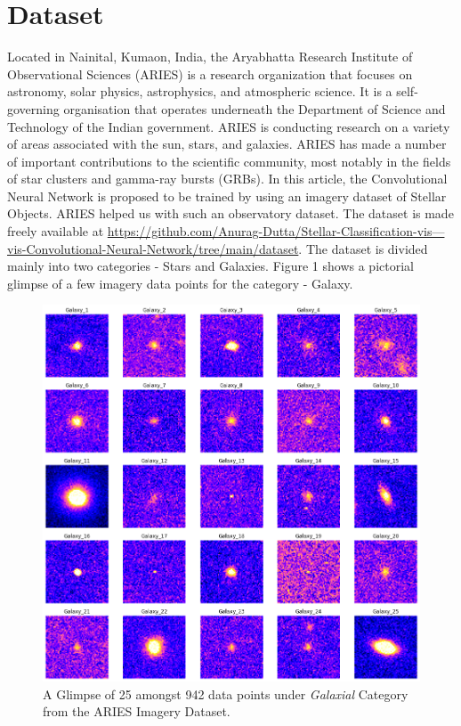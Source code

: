 \documentclass[conference]{IEEEtran}
\begin{document}
\section{Dataset}
Located in Nainital, Kumaon, India, the Aryabhatta Research Institute of Observational Sciences (ARIES) is a research organization that focuses on astronomy, solar physics, astrophysics, and atmospheric science. It is a self-governing organisation that operates underneath the Department of Science and Technology of the Indian government. ARIES is conducting research on a variety of areas associated with the sun, stars, and galaxies. ARIES has made a number of important contributions to the scientific community, most notably in the fields of star clusters and gamma-ray bursts (GRBs). In this article, the Convolutional Neural Network is proposed to be trained by using an imagery dataset of Stellar Objects. ARIES helped us with such an observatory dataset. The dataset is made freely available at \href{https://github.com/Anurag-Dutta/Stellar-Classification-vis---vis-Convolutional-Neural-Network/tree/main/dataset}{https://github.com/Anurag-Dutta/Stellar-Classification-vis---vis-Convolutional-Neural-Network/tree/main/dataset}. The dataset is divided mainly into two categories - Stars and Galaxies. Figure 1 shows a pictorial glimpse of a few imagery data points for the category - Galaxy. 
\begin{figure}[htbp]
\label{fig1}
\centerline{\includegraphics[width = \linewidth]{1}}
\caption{A Glimpse of 25 amongst 942 data points under \textit{Galaxial} Category from the ARIES Imagery Dataset. }
\end{figure}
\end{document}
